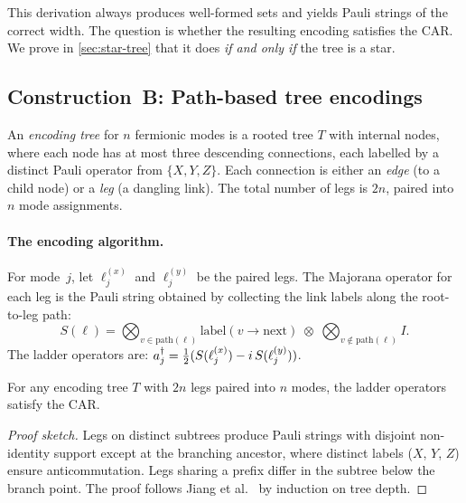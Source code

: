 This derivation always produces well-formed sets and yields Pauli
strings of the correct width.  The question is whether the resulting
encoding satisfies the CAR.  We prove in \cref{sec:star-tree} that it
does \emph{if and only if} the tree is a star.

\subsection{Construction~B: Path-based tree encodings}
\label{sec:tree-encoding}

\begin{definition}
\label{def:encoding-tree}
An \emph{encoding tree} for $n$ fermionic modes is a rooted tree $T$
with internal nodes, where each node has at most three descending
connections, each labelled by a distinct Pauli operator from $\{X, Y,
Z\}$.  Each connection is either an \emph{edge} (to a child node) or a
\emph{leg} (a dangling link).  The total number of legs is $2n$, paired
into $n$ mode assignments.
\end{definition}

\paragraph{The encoding algorithm.}
For mode~$j$, let $\ell_j^{(x)}$ and $\ell_j^{(y)}$ be the paired
legs.  The Majorana operator for each leg is the Pauli string obtained
by collecting the link labels along the root-to-leg path:
\begin{equation}
  S(\ell) = \bigotimes_{v \in \mathrm{path}(\ell)}
    \text{label}(v \to \text{next}) \;\otimes\;
    \bigotimes_{v \notin \mathrm{path}(\ell)} I.
  \label{eq:path-pauli}
\end{equation}
The ladder operators are:
$a_{j}^{\dagger} = \tfrac{1}{2}(S(\ell_j^{(x)}) - i\,S(\ell_j^{(y)}))$.

\begin{theorem}
\label{thm:tree-car}
For any encoding tree $T$ with $2n$ legs paired into $n$ modes, the
ladder operators satisfy the CAR.
\end{theorem}

\begin{proof}[Proof sketch]
Legs on distinct subtrees produce Pauli strings with disjoint
non-identity support except at the branching ancestor, where distinct
labels ($X$, $Y$, $Z$) ensure anticommutation.  Legs sharing a prefix
differ in the subtree below the branch point.  The proof follows Jiang
et al.~\cite{jiang2020} by induction on tree depth.
\end{proof}

